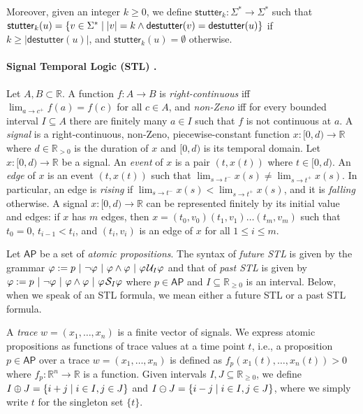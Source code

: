 \documentclass[iicol,lineno]{sn-jnl}
\newcommand{\AP}{\mathsf{AP}}
\newcommand{\destutter}{\mathsf{destutter}}
\newcommand{\stutter}{\mathsf{stutter}}
\newcommand{\R}{\mathbb{R}}
\def\until{\kern.1em\mathcal{U}}
\def\since{\kern.1em\mathcal{S}}
\newcommand{\?}{\text{?}}
\newcommand{\suchthat}{\;\ifnum\currentgrouptype=16 \middle\fi|\;}
\let\st\suchthat
\begin{document}
	Moreover, given an integer $k \geq 0$, we define $\stutter_k : \Sigma^* \to \Sigma^*$ such that $\stutter_k(u) = \{v \in \Sigma^* \st |v| = k \land \destutter(v) = \destutter(u)\}$ if $k \geq |\destutter(u)|$, and $\stutter_k(u) = \emptyset$ otherwise.
	
	\paragraph*{Signal Temporal Logic (STL) \cite{MalerN13}.}
	Let $A,B \subset \R$.
	A function $f : A \to B$ is
	\emph{right-continuous} iff $\lim_{a \to c^+} f(a) = f(c)$ for all $c \in A$, and
	\emph{non-Zeno} iff for every bounded interval $I \subseteq A$ there are finitely many $a \in I$ such that $f$ is not continuous at $a$.
	A \emph{signal} is a right-continuous, non-Zeno, piecewise-constant function $x : [0,d) \to \R$ where $d \in \R_{> 0}$ is the duration of $x$ and $[0,d)$ is its temporal domain.
	Let $x : [0,d) \to \R$ be a signal.
	An \emph{event} of $x$ is a pair $(t, x(t))$ where $t \in [0,d)$.
	An \emph{edge} of $x$ is an event $(t, x(t))$ such that $\lim_{s \to t^-} x(s) \neq \lim_{s \to t^+} x(s)$.
	In particular, an edge is \emph{rising} if $\lim_{s \to t^-} x(s) < \lim_{s \to t^+} x(s)$, and it is \emph{falling} otherwise.
	A signal $x : [0,d) \to \R$ can be represented finitely by its initial value and edges: if $x$ has $m$ edges, then $x = (t_0, v_0) (t_1, v_1) \ldots (t_m, v_m)$ such that $t_0 = 0$, $t_{i-1} < t_i$, and $(t_i, v_i)$ is an edge of $x$ for all $1 \leq i \leq m$.
	
	\bgroup \color{red}
	Let $\AP$ be a set of \emph{atomic propositions}.
	The syntax of \emph{future STL} is given by the grammar $\varphi :=  p ~|~ \lnot \varphi ~|~ \varphi \land \varphi ~|~ \varphi \until_I \varphi$ and that of \emph{past STL} is given by $\varphi :=  p ~|~ \lnot \varphi ~|~ \varphi \land \varphi ~|~ \varphi \since_I \varphi$ where $p \in \AP$ and $I \subseteq \R_{\geq 0}$ is an interval.
	Below, when we speak of an STL formula, we mean either a future STL or a past STL formula.
	\egroup
	
	A \emph{trace} $w = (x_1, \ldots, x_n)$ is a finite vector of signals.
	We express atomic propositions as functions of trace values at a time point $t$,
	i.e., a proposition $p \in \AP$ over a trace $w = (x_1, \ldots, x_n)$ is defined as $f_p(x_1(t), \ldots, x_n(t)) > 0$ where $f_p : \R^n \to \R$ is a function.
	Given intervals $I,J \subseteq \R_{\geq 0}$, we define $I \oplus J = \{i + j \st i \in I , j \in J\}$ and $I \ominus J = \{i - j \st i \in I , j \in J\}$, where we simply write $t$ for the singleton set $\{t\}$. 
	
\end{document}
